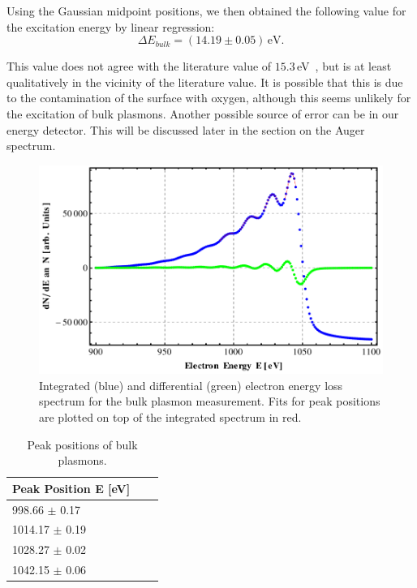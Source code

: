 \documentclass[a4paper,10pt]{scrartcl}
\begin{document}
Using the Gaussian midpoint positions, we then obtained the following value for the excitation energy by linear regression:
\begin{equation}
\Delta E_{bulk} = (14.19 \pm 0.05)\,\mbox{eV}.
\end{equation}

This value does not agree with the literature value of $15.3\,$eV~\cite{plasmonpaper}, but is at least qualitatively in the vicinity of the literature value. It is possible that this is due to the contamination of the surface with oxygen, although this seems unlikely for the excitation of bulk plasmons. Another possible source of error can be in our energy detector. This will be discussed later in the section on the Auger spectrum.

\begin{figure}
\centering
\includegraphics[scale=0.6]{img/bulkpeaks}
\caption{Integrated (blue) and differential (green) electron energy loss spectrum for the bulk plasmon measurement. Fits for peak positions are plotted on top of the integrated spectrum in red. \label{fig:bulkpeaks}}
\end{figure}


\begin{table}
\begin{center}
\begin{tabular}{lcc}
\toprule
Peak Position E [eV]\\
\midrule
\phantom{0}998.66 $\pm$ 0.17 \\
1014.17 $\pm$ 0.19 \\
1028.27 $\pm$ 0.02 \\
1042.15 $\pm$ 0.06 \\
\bottomrule
\end{tabular}
\end{center}
\par
\caption{Peak positions of bulk plasmons. \label{tab:bulkpeaks}}
\end{table}
\end{document}
